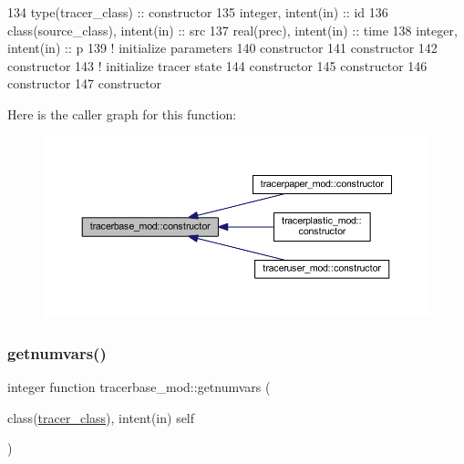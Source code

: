 \begin{DoxyCode}
134     \textcolor{keywordtype}{type}(tracer\_class) :: constructor
135     \textcolor{keywordtype}{integer}, \textcolor{keywordtype}{intent(in)} :: id
136     \textcolor{keywordtype}{class}(source\_class), \textcolor{keywordtype}{intent(in)} :: src
137     \textcolor{keywordtype}{real(prec)}, \textcolor{keywordtype}{intent(in)} :: time
138     \textcolor{keywordtype}{integer}, \textcolor{keywordtype}{intent(in)} :: p
139     \textcolor{comment}{! initialize parameters}
140     constructor%
141     constructor%
142     constructor%
143     \textcolor{comment}{! initialize tracer state}
144     constructor%
145     constructor%
146     constructor%
147     constructor%
\end{DoxyCode}
Here is the caller graph for this function\+:\nopagebreak
\begin{figure}[H]
\begin{center}
\leavevmode
\includegraphics[width=350pt]{namespacetracerbase__mod_aefc12c2007d7598ff9b35733b430a3a2_icgraph}
\end{center}
\end{figure}
\mbox{\label{namespacetracerbase__mod_a0be55b393be0846cbbe6be9feb3bb539}} 
\subsubsection{\texorpdfstring{getnumvars()}{getnumvars()}}
{\footnotesize\ttfamily integer function tracerbase\+\_\+mod\+::getnumvars (\begin{DoxyParamCaption}\item[{class(\mbox{\hyperlink{structtracerbase__mod_1_1tracer__class}{tracer\+\_\+class}}), intent(in)}]{self }\end{DoxyParamCaption})\hspace{0.3cm}{\ttfamily [private]}}



